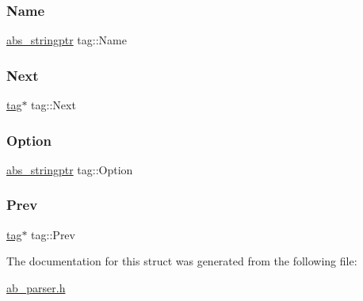\subsubsection{\texorpdfstring{Name}{Name}}
{\footnotesize\ttfamily \hyperlink{structabs__stringptr}{abs\+\_\+stringptr} tag\+::\+Name}

\mbox{\label{structtag_ae16f0e5fb461cdbae551134f3e1e8e24}} 
\subsubsection{\texorpdfstring{Next}{Next}}
{\footnotesize\ttfamily \hyperlink{structtag}{tag}$\ast$ tag\+::\+Next}

\mbox{\label{structtag_aa52b4f28c97f8ff006a5fe50d6623a7e}} 
\subsubsection{\texorpdfstring{Option}{Option}}
{\footnotesize\ttfamily \hyperlink{structabs__stringptr}{abs\+\_\+stringptr} tag\+::\+Option}

\mbox{\label{structtag_af05983b55100a16b3bcd8faad9b50e00}} 
\subsubsection{\texorpdfstring{Prev}{Prev}}
{\footnotesize\ttfamily \hyperlink{structtag}{tag}$\ast$ tag\+::\+Prev}



The documentation for this struct was generated from the following file\+:\begin{DoxyCompactItemize}
\item 
\hyperlink{ab__parser_8h}{ab\+\_\+parser.\+h}\end{DoxyCompactItemize}
